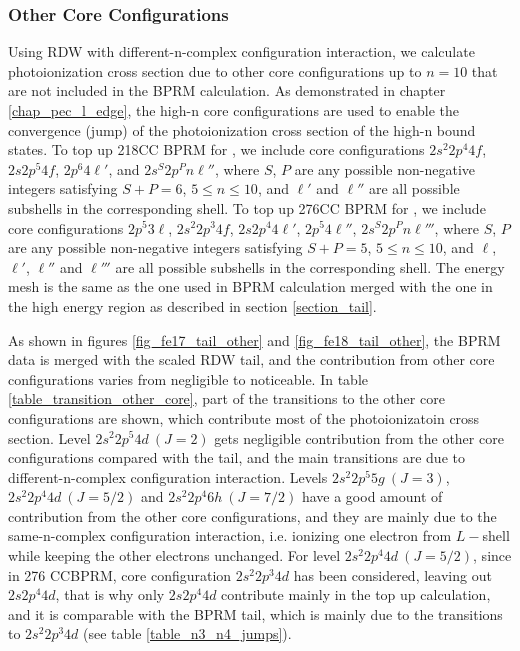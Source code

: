 \subsubsection{Other Core Configurations} \label{section_other_targets}
Using RDW with different-n-complex configuration interaction, we calculate photoionization cross section due to other core configurations up to $n=10$ that are not included in the BPRM calculation. As demonstrated in chapter \ref{chap_pec_l_edge}, the high-n core configurations are used to enable the convergence (jump) of the photoionization cross section of the high-n bound states. To top up 218CC BPRM for , we include core configurations $2s^2 2p^4 4f$, $2s 2p^5 4f$, $2p^6 4\ell'$, and $2s^S 2p^P n\ell''$, where  $S$, $P$ are any possible non-negative integers satisfying $S+P=6$, $5 \leq n \leq 10$, and $\ell'$ and $\ell''$ are all possible subshells in the corresponding shell. To top up 276CC BPRM for , we include core configurations $2p^5 3\ell$, $2s^2 2p^3 4f$, $2s 2p^4 4\ell'$,  $2p^5 4\ell''$,  $2s^S 2p^P n\ell'''$, where  $S$, $P$ are any possible non-negative integers satisfying $S+P=5$, $5 \leq n \leq 10$, and $\ell$, $\ell'$, $\ell''$ and $\ell'''$ are all possible subshells in the corresponding shell. The energy mesh is the same as the one used in BPRM calculation merged with the one in the high energy region as described in section \ref{section_tail}. 

As shown in figures \ref{fig_fe17_tail_other} and \ref{fig_fe18_tail_other}, the BPRM data is merged with the scaled RDW tail, and the contribution from other core configurations varies from negligible to noticeable. In table \ref{table_transition_other_core}, part of the transitions to the other core configurations are shown, which contribute most of the photoionizatoin cross section. Level $ 2s^2 2p^5 4d~(J=2) $ gets negligible contribution from the other core configurations compared with the tail, and the main transitions are due to different-n-complex configuration interaction. Levels $2s^2 2p^5 5g~(J=3)$, $2s^2 2p^4 4d~(J=5/2)$ and $2s^2 2p^4 6h~(J=7/2)$ have a good amount of contribution from the other core configurations, and they are mainly due to the same-n-complex configuration interaction, i.e. ionizing one electron from $L-$shell while keeping the other electrons unchanged. For level $2s^2 2p^4 4d~(J=5/2)$, since in 276 CCBPRM, core configuration $2s^2 2p^3 4d$ has been considered, leaving out $2s 2p^4 4d$, that is why only $2s 2p^4 4d$ contribute mainly in the top up calculation, and it is comparable with the BPRM tail, which is mainly due to the transitions to $2s^2 2p^3 4d$ (see table \ref{table_n3_n4_jumps}). 

